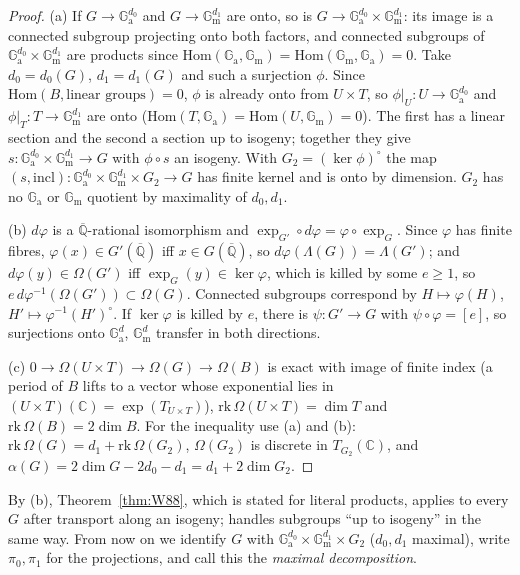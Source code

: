 \documentclass[11pt]{amsart}
\theoremstyle{definition}
\newcommand{\Qb}{\overline{\mathbb{Q}}}
\newcommand{\C}{\mathbb{C}}
\newcommand{\Ga}{\mathbb{G}_{\mathrm a}}
\newcommand{\Gm}{\mathbb{G}_{\mathrm m}}
\begin{document}
\begin{proof}
(a) If $G\to\Ga^{d_0}$ and $G\to\Gm^{d_1}$ are onto, so is $G\to\Ga^{d_0}\times\Gm^{d_1}$: its image is a connected subgroup
projecting onto both factors, and connected subgroups of $\Ga^{d_0}\times\Gm^{d_1}$ are products since
$\mathrm{Hom}(\Ga,\Gm)=\mathrm{Hom}(\Gm,\Ga)=0$. Take $d_0=d_0(G)$, $d_1=d_1(G)$ and such a surjection $\phi$. Since
$\mathrm{Hom}(B,\text{linear groups})=0$, $\phi$ is already onto from $U\times T$, so $\phi|_U\colon U\to\Ga^{d_0}$ and
$\phi|_T\colon T\to\Gm^{d_1}$ are onto ($\mathrm{Hom}(T,\Ga)=\mathrm{Hom}(U,\Gm)=0$). The first has a linear section and the
second a section up to isogeny; together they give $s\colon\Ga^{d_0}\times\Gm^{d_1}\to G$ with $\phi\circ s$ an isogeny.
With $G_2=(\ker\phi)^\circ$ the map $(s,\mathrm{incl})\colon\Ga^{d_0}\times\Gm^{d_1}\times G_2\to G$ has finite kernel and
is onto by dimension. $G_2$ has no $\Ga$ or $\Gm$ quotient by maximality of $d_0,d_1$.

(b) $d\varphi$ is a $\Qb$-rational isomorphism and $\exp_{G'}\circ d\varphi=\varphi\circ\exp_G$. Since $\varphi$ has finite
fibres, $\varphi(x)\in G'(\Qb)$ iff $x\in G(\Qb)$, so $d\varphi(\Lambda(G))=\Lambda(G')$; and $d\varphi(y)\in\Omega(G')$ iff
$\exp_G(y)\in\ker\varphi$, which is killed by some $e\ge1$, so $e\,d\varphi^{-1}(\Omega(G'))\subset\Omega(G)$. Connected
subgroups correspond by $H\mapsto\varphi(H)$, $H'\mapsto\varphi^{-1}(H')^\circ$. If $\ker\varphi$ is killed by $e$, there is
$\psi\colon G'\to G$ with $\psi\circ\varphi=[e]$, so surjections onto $\Ga^d$, $\Gm^d$ transfer in both directions.

(c) $0\to\Omega(U\times T)\to\Omega(G)\to\Omega(B)$ is exact with image of finite index (a period of $B$ lifts to a vector
whose exponential lies in $(U\times T)(\C)=\exp(T_{U\times T})$), $\mathrm{rk}\,\Omega(U\times T)=\dim T$ and
$\mathrm{rk}\,\Omega(B)=2\dim B$. For the inequality use (a) and (b): $\mathrm{rk}\,\Omega(G)=d_1+\mathrm{rk}\,\Omega(G_2)$,
$\Omega(G_2)$ is discrete in $T_{G_2}(\C)$, and $\alpha(G)=2\dim G-2d_0-d_1=d_1+2\dim G_2$.
\end{proof}

\noindent By (b), Theorem~\ref{thm:W88}, which is stated for literal products, applies to every $G$ after transport along an
isogeny; \cite[p.~389]{W88} handles subgroups ``up to isogeny'' in the same way. From now on we identify $G$ with
$\Ga^{d_0}\times\Gm^{d_1}\times G_2$ ($d_0,d_1$ maximal), write $\pi_0,\pi_1$ for the projections, and call this the
\emph{maximal decomposition}.
\end{document}

